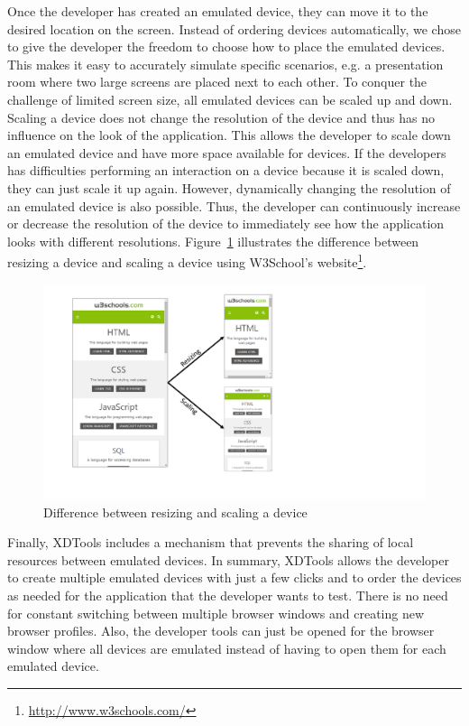 Once the developer has created an emulated device, they can move it to the desired location on the screen. Instead of ordering devices automatically, we chose to give the developer the freedom to choose how to place the emulated devices. This makes it easy to accurately simulate specific scenarios, e.g. a presentation room where two large screens are placed next to each other. To conquer the challenge of limited screen size, all emulated devices can be scaled up and down. Scaling a device does not change the resolution of the device and thus has no influence on the look of the application. This allows the developer to scale down an emulated device and have more space available for devices. If the developers has difficulties performing an interaction on a device because it is scaled down, they can just scale it up again. However, dynamically changing the resolution of an emulated device is also possible. Thus, the developer can continuously increase or decrease the resolution of the device to immediately see how the application looks with different resolutions. Figure~\ref{fig:difference_resizing_scaling} illustrates the difference between resizing a device and scaling a device using W3School's website\footnote{\url{http://www.w3schools.com/}}.

\begin{figure}[H]
  \centering
    \includegraphics[width=1.0\textwidth]{images/difference_scaling_resizing.pdf}
	\caption[Difference between resizing and scaling a device]{Difference between resizing and scaling a device}
	\label{fig:difference_resizing_scaling}
\end{figure}

Finally, XDTools includes a mechanism that prevents the sharing of local resources between emulated devices. In summary, XDTools allows the developer to create multiple emulated devices with just a few clicks and to order the devices as needed for the application that the developer wants to test. There is no need for constant switching between multiple browser windows and creating new browser profiles. Also, the developer tools can just be opened for the browser window where all devices are emulated instead of having to open them for each emulated device.
 
